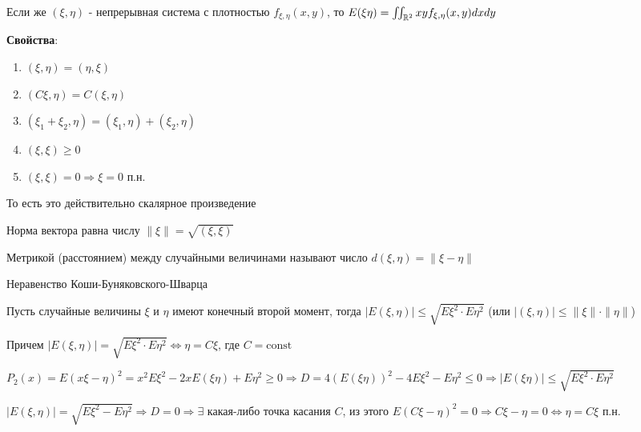 \documentclass[12pt]{article}
\begin{document}
Если же $(\xi, \eta)$ - непрерывная система с плотностью $f_{\xi, \eta}(x, y)$, 
то $E(\xi\eta) = \iint_{\mathbb{R}^2} xy f_{\xi, \eta}(x, y) dxdy$

\mediumvspace

\textbf{Свойства}:

\begin{enumerate}
    \item $(\xi, \eta) = (\eta, \xi)$

    \item $(C\xi, \eta) = C(\xi, \eta)$

    \item $(\xi_1 + \xi_2, \eta) = (\xi_1, \eta) + (\xi_2, \eta)$

    \item $(\xi, \xi) \geq 0$

    \item $(\xi, \xi) = 0 \Longrightarrow \xi = 0$ п.н.
\end{enumerate}

То есть это действительно скалярное произведение

\Def Норма вектора равна числу $\|\xi\| = \sqrt{(\xi, \xi)}$

\Def Метрикой (расстоянием) между случайными величинами называют число $d(\xi, \eta) = \|\xi - \eta\|$

\begin{MyTheorem}
    \Ths Неравенство Коши-Буняковского-Шварца

    Пусть случайные величины $\xi$ и $\eta$ имеют конечный второй момент, тогда 
    $|E(\xi, \eta)| \leq \sqrt{E\xi^2 \cdot E\eta^2}$ (или $|(\xi, \eta)| \leq \|\xi\|\cdot\|\eta\|$)

    Причем $|E(\xi, \eta)| = \sqrt{E\xi^2 \cdot E\eta^2} \Longleftrightarrow \eta = C\xi$, где $C = \mathrm{const}$
\end{MyTheorem}

\begin{MyProof}
    $P_2(x) = E(x\xi - \eta)^2 = x^2 E\xi^2 - 2xE(\xi\eta) + E\eta^2 \geq 0 \Longrightarrow D = 4(E(\xi\eta))^2 - 
    4 E\xi^2 - E\eta^2 \leq 0 \Longrightarrow |E(\xi\eta)| \leq \sqrt{E\xi^2 \cdot E\eta^2}$
    
    $|E(\xi, \eta)| = \sqrt{E\xi^2 - E\eta^2} \Longrightarrow D = 0 \Longrightarrow \exists$ какая-либо точка касания $C$, 
    из этого $E(C\xi - \eta)^2 = 0 \Longrightarrow C\xi - \eta = 0 \Longleftrightarrow \eta = C\xi \text{ п.н. }$
\end{MyProof}
\end{document}
